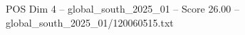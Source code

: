 \begin{textsample}{POS Dim 4 – global\_south\_2025\_01 – Score 26.00 – global\_south\_2025\_01/120060515.txt}
\end{textsample}
